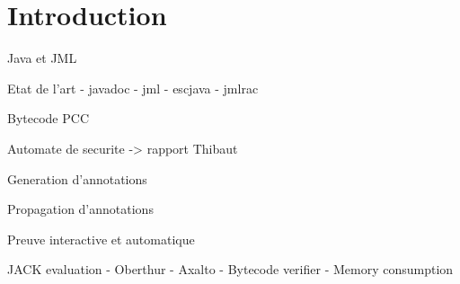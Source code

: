 \chapter{Introduction}

Java et JML

Etat de l'art
- javadoc
- jml
- escjava
- jmlrac

Bytecode PCC

Automate de securite -> rapport Thibaut

Generation d'annotations

Propagation d'annotations

Preuve interactive et automatique

JACK evaluation 
	- Oberthur
	- Axalto
	- Bytecode verifier
	- Memory consumption

